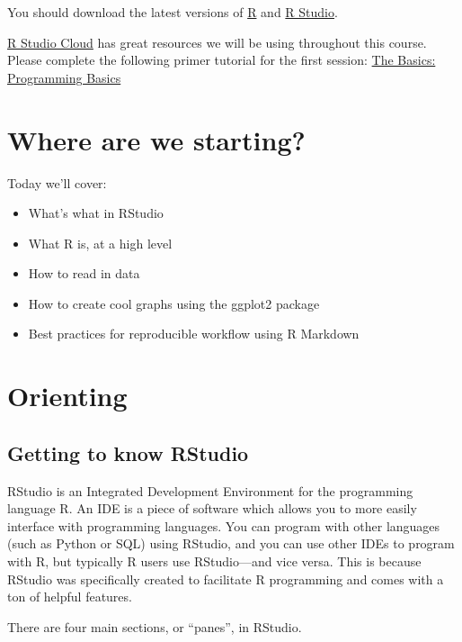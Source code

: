 \documentclass[
  letterpaper,
]{book}
\providecommand{\tightlist}{%
  \setlength{\itemsep}{0pt}\setlength{\parskip}{0pt}}\usepackage{longtable,booktabs,array}
\theoremstyle{definition}
\theoremstyle{definition}
\theoremstyle{plain}
\theoremstyle{definition}
\theoremstyle{plain}
\theoremstyle{plain}
\theoremstyle{remark}
\begin{document}
You should download the latest versions of
\href{https://cran.r-project.org/}{R} and
\href{https://www.rstudio.com/products/rstudio/}{R Studio}.

\href{https://rstudio.cloud/learn/primers/}{R Studio Cloud} has great
resources we will be using throughout this course. Please complete the
following primer tutorial for the first session:
\href{https://rstudio.cloud/learn/primers/1.2}{The Basics: Programming
Basics}

\hypertarget{where-are-we-starting}{%
\section*{Where are we starting?}\label{where-are-we-starting}}

Today we'll cover:

\begin{itemize}
\tightlist
\item
  What's what in RStudio
\item
  What R is, at a high level
\item
  How to read in data
\item
  How to create cool graphs using the ggplot2 package
\item
  Best practices for reproducible workflow using R Markdown
\end{itemize}

\hypertarget{orienting}{%
\section{Orienting}\label{orienting}}

\hypertarget{getting-to-know-rstudio}{%
\subsection{Getting to know RStudio}\label{getting-to-know-rstudio}}

RStudio is an Integrated Development Environment for the programming
language R. An IDE is a piece of software which allows you to more
easily interface with programming languages. You can program with other
languages (such as Python or SQL) using RStudio, and you can use other
IDEs to program with R, but typically R users use RStudio---and vice
versa. This is because RStudio was specifically created to facilitate R
programming and comes with a ton of helpful features.

There are four main sections, or ``panes'', in RStudio.
\end{document}
